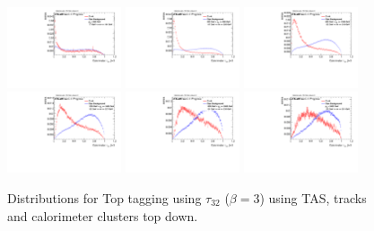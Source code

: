 \begin{figure}[H]
\bigskip
\includegraphics[width=0.3\textwidth]{sascha_input/Appendix/Distributions/top/distributions/beta3/h_recoJet_nSub32_3_bin1.pdf} \hspace{1mm}
\includegraphics[width=0.3\textwidth]{sascha_input/Appendix/Distributions/top/distributions/beta3/h_recoJet_nSub32_3_bin2.pdf} \hspace{1mm}
\includegraphics[width=0.3\textwidth]{sascha_input/Appendix/Distributions/top/distributions/beta3/h_recoJet_nSub32_3_bin3.pdf} 
\bigskip
\includegraphics[width=0.3\textwidth]{sascha_input/Appendix/Distributions/top/distributions/beta3/h_recoJet_nSub32_3_bin4.pdf} \hspace{6mm}
\includegraphics[width=0.3\textwidth]{sascha_input/Appendix/Distributions/top/distributions/beta3/h_recoJet_nSub32_3_bin5.pdf} \hspace{6mm}
\includegraphics[width=0.3\textwidth]{sascha_input/Appendix/Distributions/top/distributions/beta3/h_recoJet_nSub32_3_bin6.pdf}
\caption{\footnotesize{Distributions for Top tagging using $\tau_{32}$ ($\beta=3$) using TAS, tracks and calorimeter clusters top down.}}
\end{figure}

